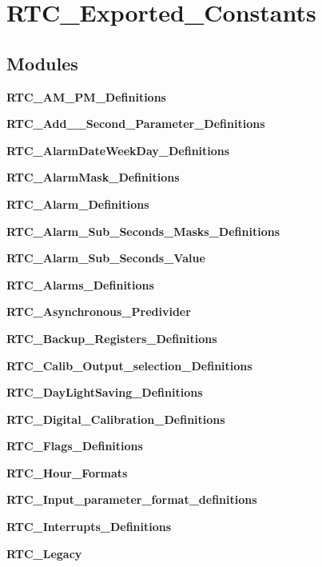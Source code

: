 \section{R\+T\+C\+\_\+\+Exported\+\_\+\+Constants}
\label{group__RTC__Exported__Constants}
\subsection*{Modules}
\begin{DoxyCompactItemize}
\item 
\textbf{ R\+T\+C\+\_\+\+A\+M\+\_\+\+P\+M\+\_\+\+Definitions}
\item 
\textbf{ R\+T\+C\+\_\+\+Add\+\_\+\_\+\+Second\+\_\+\+Parameter\+\_\+\+Definitions}
\item 
\textbf{ R\+T\+C\+\_\+\+Alarm\+Date\+Week\+Day\+\_\+\+Definitions}
\item 
\textbf{ R\+T\+C\+\_\+\+Alarm\+Mask\+\_\+\+Definitions}
\item 
\textbf{ R\+T\+C\+\_\+\+Alarm\+\_\+\+Definitions}
\item 
\textbf{ R\+T\+C\+\_\+\+Alarm\+\_\+\+Sub\+\_\+\+Seconds\+\_\+\+Masks\+\_\+\+Definitions}
\item 
\textbf{ R\+T\+C\+\_\+\+Alarm\+\_\+\+Sub\+\_\+\+Seconds\+\_\+\+Value}
\item 
\textbf{ R\+T\+C\+\_\+\+Alarms\+\_\+\+Definitions}
\item 
\textbf{ R\+T\+C\+\_\+\+Asynchronous\+\_\+\+Predivider}
\item 
\textbf{ R\+T\+C\+\_\+\+Backup\+\_\+\+Registers\+\_\+\+Definitions}
\item 
\textbf{ R\+T\+C\+\_\+\+Calib\+\_\+\+Output\+\_\+selection\+\_\+\+Definitions}
\item 
\textbf{ R\+T\+C\+\_\+\+Day\+Light\+Saving\+\_\+\+Definitions}
\item 
\textbf{ R\+T\+C\+\_\+\+Digital\+\_\+\+Calibration\+\_\+\+Definitions}
\item 
\textbf{ R\+T\+C\+\_\+\+Flags\+\_\+\+Definitions}
\item 
\textbf{ R\+T\+C\+\_\+\+Hour\+\_\+\+Formats}
\item 
\textbf{ R\+T\+C\+\_\+\+Input\+\_\+parameter\+\_\+format\+\_\+definitions}
\item 
\textbf{ R\+T\+C\+\_\+\+Interrupts\+\_\+\+Definitions}
\item 
\textbf{ R\+T\+C\+\_\+\+Legacy}
\item 

\end{DoxyCompactItemize}
